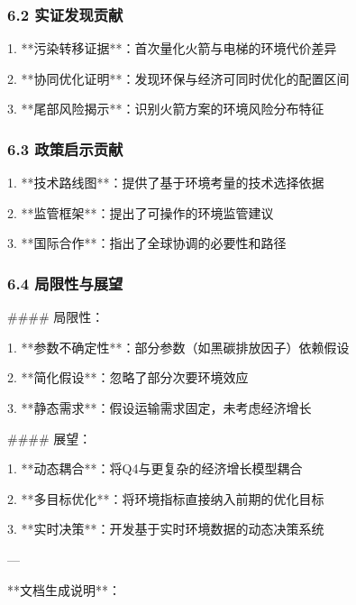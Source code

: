 \documentclass[a4paper,12pt]{article}
\begin{document}
\par
\subsubsection{6.2 实证发现贡献}
1. **污染转移证据**：首次量化火箭与电梯的环境代价差异

\par
2. **协同优化证明**：发现环保与经济可同时优化的配置区间

\par
3. **尾部风险揭示**：识别火箭方案的环境风险分布特征

\par
\subsubsection{6.3 政策启示贡献}
1. **技术路线图**：提供了基于环境考量的技术选择依据

\par
2. **监管框架**：提出了可操作的环境监管建议

\par
3. **国际合作**：指出了全球协调的必要性和路径

\par
\subsubsection{6.4 局限性与展望}
#### 局限性：

\par
1. **参数不确定性**：部分参数（如黑碳排放因子）依赖假设

\par
2. **简化假设**：忽略了部分次要环境效应

\par
3. **静态需求**：假设运输需求固定，未考虑经济增长

\par
#### 展望：

\par
1. **动态耦合**：将Q4与更复杂的经济增长模型耦合

\par
2. **多目标优化**：将环境指标直接纳入前期的优化目标

\par
3. **实时决策**：开发基于实时环境数据的动态决策系统

\par
---

\par
**文档生成说明**：
\end{document}
